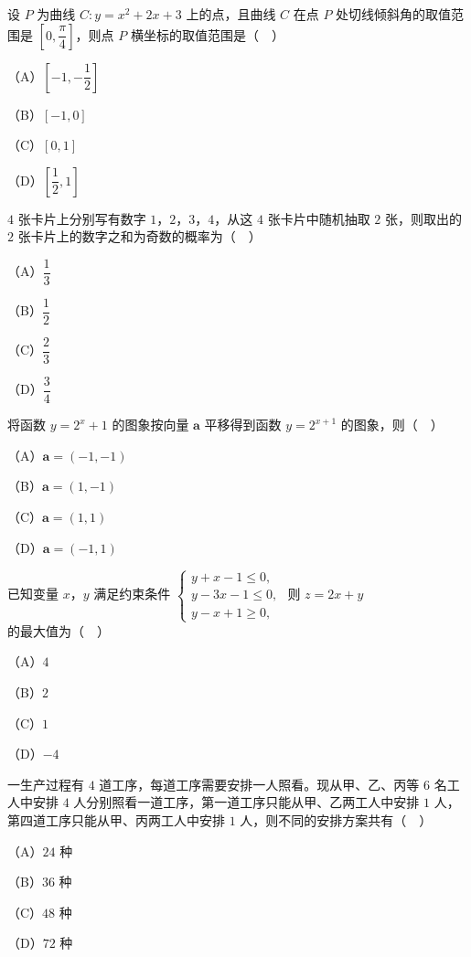 \begin{question}
设 $P$ 为曲线 $C:y=x^2+2x+3$ 上的点，且曲线 $C$ 在点 $P$ 处切线倾斜角的取值范围是 $\left[0,\dfrac{\pi}{4}\right]$，则点 $P$ 横坐标的取值范围是（　）

（A）$\left[-1,-\dfrac12\right]$

（B）$[-1,0]$

（C）$[0,1]$

（D）$\left[\dfrac12,1\right]$

\end{question}
\begin{question}
$4$ 张卡片上分别写有数字 $1$，$2$，$3$，$4$，从这 $4$ 张卡片中随机抽取 $2$ 张，则取出的 $2$ 张卡片上的数字之和为奇数的概率为（　）

（A）$\dfrac13$

（B）$\dfrac12$

（C）$\dfrac23$

（D）$\dfrac34$

\end{question}
\begin{question}
将函数 $y=2^x+1$ 的图象按向量 $\boldsymbol a$ 平移得到函数 $y=2^{x+1}$ 的图象，则（　）

（A）$\boldsymbol a=(-1,-1)$

（B）$\boldsymbol a=(1,-1)$

（C）$\boldsymbol a=(1,1)$

（D）$\boldsymbol a=(-1,1)$

\end{question}
\begin{question}
已知变量 $x$，$y$ 满足约束条件 $\begin{cases}y+x-1\leqslant0,\\ y-3x-1\leqslant0,\\ y-x+1\geqslant0,\end{cases}$ 则 $z=2x+y$ 的最大值为（　）

（A）$4$

（B）$2$

（C）$1$

（D）$-4$

\end{question}
\begin{question}
一生产过程有 $4$ 道工序，每道工序需要安排一人照看。现从甲、乙、丙等 $6$ 名工人中安排 $4$ 人分别照看一道工序，第一道工序只能从甲、乙两工人中安排 $1$ 人，第四道工序只能从甲、丙两工人中安排 $1$ 人，则不同的安排方案共有（　）

（A）$24$ 种

（B）$36$ 种

（C）$48$ 种

（D）$72$ 种

\end{question}
